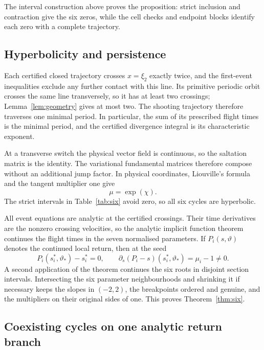 \documentclass[11pt]{article}
\theoremstyle{remark}
\begin{document}
The interval construction above proves the proposition: strict inclusion
and contraction give the six zeros, while the cell checks and endpoint
blocks identify each zero with a complete trajectory.

\subsection{Hyperbolicity and persistence}

Each certified closed trajectory crosses \(x=\xi_2\) exactly twice,
and the first-event inequalities exclude any further contact with this
line.  Its primitive periodic orbit crosses the same line transversely,
so it has at least two crossings; Lemma~\ref{lem:geometry} gives at
most two.  The shooting trajectory therefore traverses one minimal
period.  In particular, the sum of its prescribed flight times is the
minimal period, and the certified divergence integral is its
characteristic exponent.

At a transverse switch the physical vector field is continuous, so the
saltation matrix is the identity.  The variational fundamental matrices
therefore compose without an additional jump factor.  In physical
coordinates, Liouville's formula and the tangent multiplier one give
\begin{equation}\label{eq:multiplier}
                       \mu=\exp(\chi).
\end{equation}
The strict intervals in Table~\ref{tab:six} avoid zero, so all six
cycles are hyperbolic.

All event equations are analytic at the certified crossings.  Their time
derivatives are the nonzero crossing velocities, so the analytic implicit
function theorem continues the flight times in the seven normalised
parameters.  If \(P_i(s,\vartheta)\) denotes the continued local return,
then at the seed
\[
 P_i(s_i^*,\vartheta_*)-s_i^*=0,\qquad
 \partial_s(P_i-s)(s_i^*,\vartheta_*)=\mu_i-1\ne0.
\]
A second application of the theorem continues the six roots in disjoint
section intervals.  Intersecting the six parameter neighbourhoods and
shrinking it if necessary keeps the slopes in \((-2,2)\), the breakpoints
ordered and genuine, and the multipliers on their original sides of one.
This proves Theorem~\ref{thm:six}.

\subsection{Coexisting cycles on one analytic return branch}
\end{document}
